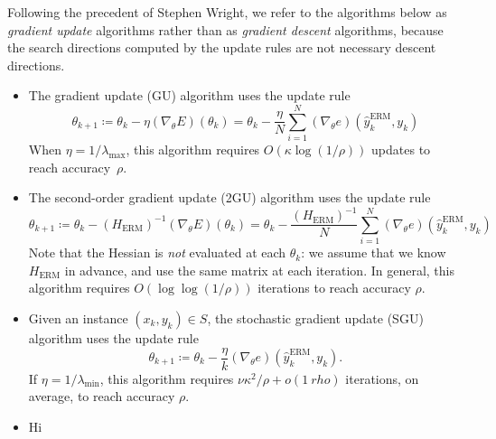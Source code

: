 \documentclass[11pt,a4paper]{article}
\numberwithin{equation}{section}
\begin{document}
Following the precedent of Stephen Wright, we refer to the algorithms below as
\emph{gradient update} algorithms rather than as \emph{gradient descent}
algorithms, because the search directions computed by the update rules are not
necessary descent directions.
\begin{itemize} 
\item The gradient update (GU) algorithm uses the update rule
\[
	\theta_{k + 1}
	\coloneqq \theta_k - \eta (\nabla_\theta E)(\theta_k)
	= \theta_k - \frac{\eta}{N} \sum_{i = 1}^N
		(\nabla_\theta e)(\hat{y}_k^{\text{ERM}}, y_k)
\]
When $\eta = 1/\lambda_{\text{max}}$, this algorithm requires $O(\kappa \log(1 /
\rho))$ updates to reach accuracy~$\rho$.

\item The second-order gradient update (2GU) algorithm uses the update rule
\[
	\theta_{k + 1}
	\coloneqq \theta_k - (H_{\text{ERM}})^{-1} (\nabla_\theta E)(\theta_k)
	= \theta_k - \frac{(H_{\text{ERM}})^{-1}}{N} \sum_{i = 1}^N
		(\nabla_\theta e)(\hat{y}_k^{\text{ERM}}, y_k)
\]
Note that the Hessian is \emph{not} evaluated at each $\theta_k$: we assume that
we know $H_{\text{ERM}}$ in advance, and use the same matrix at each iteration.
In general, this algorithm requires $O(\log\log(1 / \rho))$ iterations to reach
accuracy $\rho$.

\item Given an instance $(x_k, y_k) \in S$, the stochastic gradient update (SGU)
algorithm uses the update rule
\[
	\theta_{k + 1}
	\coloneqq \theta_k - \frac{\eta}{k}
		(\nabla_\theta e)(\hat{y}_k^{\text{ERM}}, y_k).
\]
If $\eta = 1/\lambda_{\text{min}}$, this algorithm requires $\nu \kappa^2 / \rho
+ o(1 \ rho)$ iterations, on average, to reach accuracy $\rho$.

\item Hi
\end{itemize}



\end{document}
